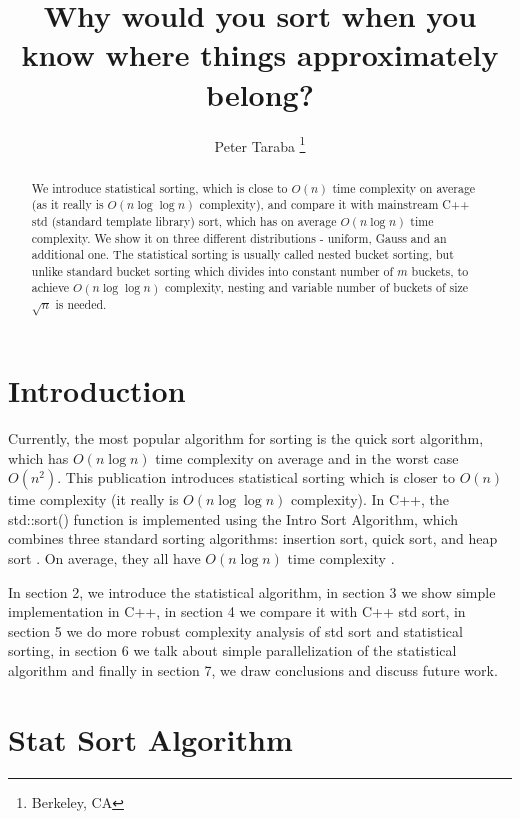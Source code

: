 \documentclass[12pt]{article}
\title{Why would you sort when you know where things approximately belong?}
\author{Peter Taraba \footnote{Berkeley, CA}}
\begin{document}
	
	\maketitle
	
	\begin{abstract}
  		We introduce statistical sorting, which is close to $O(n)$ time complexity on average (as it really is $O(n \log \log n)$ complexity), and compare it with mainstream C++ std (standard template library) sort, which has on average $O(n \log n)$ time complexity. We show it on three different distributions - uniform, Gauss and an additional one. The statistical sorting is usually called nested bucket sorting, but unlike standard bucket sorting which divides into constant number of $m$ buckets, to achieve $O(n \log \log n)$ complexity, nesting and variable number of buckets of size $\sqrt{n}$ is needed.
	\end{abstract}
	
	\section{Introduction}
	
		Currently, the most popular algorithm for sorting is the quick sort algorithm, which has $O(n \log n)$ time complexity on average \cite{numrec} and in the worst case $O(n^2)$. This publication introduces statistical sorting which is closer to $O(n)$ time complexity (it really is $O(n \log \log n)$ complexity). In C++, the std::sort() function is implemented using the Intro Sort Algorithm, which combines three standard sorting algorithms: insertion sort, quick sort, and heap sort \cite{cppsort}. On average, they all have $O(n \log n)$ time complexity \cite{wikisort}.
		
		In section 2, we introduce the statistical algorithm, in section 3 we show simple implementation in C++, in section 4 we compare it with C++ std sort, in section 5 we do more robust complexity analysis of std sort and statistical sorting, in section 6 we talk about simple parallelization of the statistical algorithm and finally in section 7, we draw conclusions and discuss future work.

	\section{Stat Sort Algorithm}
	
\end{document}
